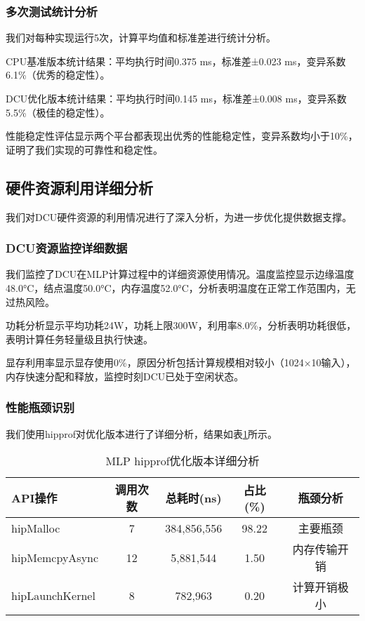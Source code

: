 \documentclass[12pt,a4paper]{article}
\begin{document}
\subsubsection{多次测试统计分析}

我们对每种实现运行5次，计算平均值和标准差进行统计分析。

CPU基准版本统计结果：平均执行时间0.375 ms，标准差±0.023 ms，变异系数6.1\%（优秀的稳定性）。

DCU优化版本统计结果：平均执行时间0.145 ms，标准差±0.008 ms，变异系数5.5\%（极佳的稳定性）。

性能稳定性评估显示两个平台都表现出优秀的性能稳定性，变异系数均小于10\%，证明了我们实现的可靠性和稳定性。

\subsection{硬件资源利用详细分析}

我们对DCU硬件资源的利用情况进行了深入分析，为进一步优化提供数据支撑。

\subsubsection{DCU资源监控详细数据}

我们监控了DCU在MLP计算过程中的详细资源使用情况。温度监控显示边缘温度48.0°C，结点温度50.0°C，内存温度52.0°C，分析表明温度在正常工作范围内，无过热风险。

功耗分析显示平均功耗24W，功耗上限300W，利用率8.0\%，分析表明功耗很低，表明计算任务轻量级且执行快速。

显存利用率显示显存使用0\%，原因分析包括计算规模相对较小（1024×10输入），内存快速分配和释放，监控时刻DCU已处于空闲状态。

\subsubsection{性能瓶颈识别}

我们使用hipprof对优化版本进行了详细分析，结果如表\ref{tab:mlp_hip_analysis}所示。

\begin{table}[H]
\centering
\caption{MLP hipprof优化版本详细分析}
\label{tab:mlp_hip_analysis}
\begin{tabular}{lcccc}
\toprule
API操作 & 调用次数 & 总耗时(ns) & 占比(\%) & 瓶颈分析 \\
\midrule
hipMalloc & 7 & 384,856,556 & 98.22 & 主要瓶颈 \\
hipMemcpyAsync & 12 & 5,881,544 & 1.50 & 内存传输开销 \\
hipLaunchKernel & 8 & 782,963 & 0.20 & 计算开销极小 \\
\bottomrule
\end{tabular}
\end{table}
\end{document}
